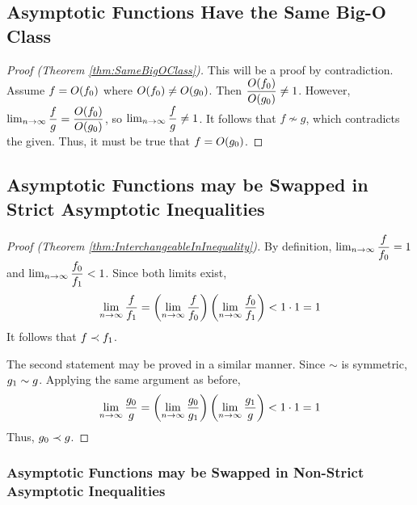 \subsection{Asymptotic Functions Have the Same Big-O Class}

\begin{proof}[Proof (Theorem \ref{thm:SameBigOClass})]
	This will be a proof by contradiction. Assume $f = O(f_0)$ where $O(f_0) \neq O(g_0)$. Then $\dfrac {O(f_0)} {O(g_0)} \neq 1$. However, $\lim_{n \to \infty} \dfrac{f}{g} = \dfrac {O(f_0)} {O(g_0)}$, so $\lim_{n \to \infty} \dfrac{f}{g} \neq 1$. It follows that $f \not\sim g$, which contradicts the given. Thus, it must be true that $f = O(g_0)$.
\end{proof}

\subsection{Asymptotic Functions may be Swapped in Strict Asymptotic Inequalities}

\begin{proof}[Proof (Theorem \ref{thm:InterchangeableInInequality})]
	By definition, $\lim_{n \to \infty} \dfrac{f}{f_0} = 1$ and $\lim_{n \to \infty} \dfrac{f_0}{f_1} < 1$. Since both limits exist,
	\begin{align*}
	\lim_{n \to \infty} \frac{f}{f_1} = \left( \lim_{n \to \infty} \frac{f}{f_0} \right) \left( \lim_{n \to \infty} \frac{f_0}{f_1} \right) < 1 \cdot 1 = 1
	\end{align*}
	It follows that $f \prec f_1$.
	
	The second statement may be proved in a similar manner. Since $\sim$ is symmetric, $g_1 \sim g$. Applying the same argument as before,
	\begin{align*}
	\lim_{n \to \infty} \frac{g_0}{g} = \left( \lim_{n \to \infty} \frac{g_0}{g_1} \right) \left( \lim_{n \to \infty} \frac{g_1}{g} \right) < 1 \cdot 1 = 1
	\end{align*}
	Thus, $g_0 \prec g$.
\end{proof}

\subsubsection{Asymptotic Functions may be Swapped in Non-Strict Asymptotic Inequalities}

